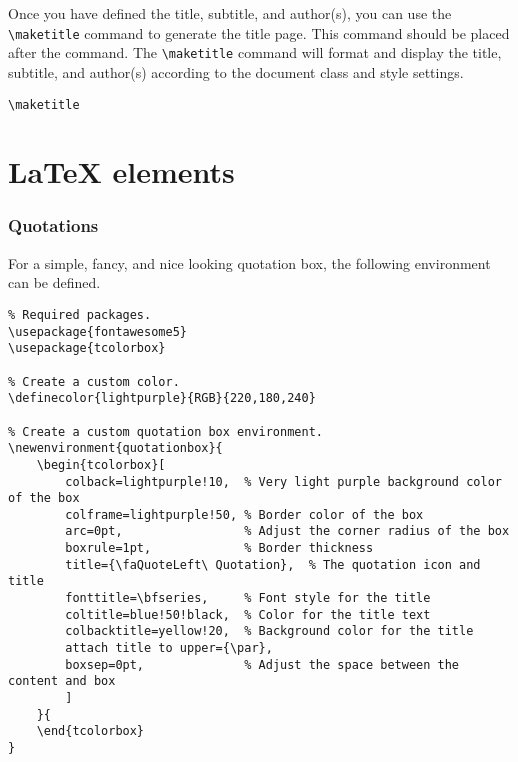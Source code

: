 Once you have defined the title, subtitle, and author(s), you can use the \lstinline|\maketitle| command to generate the title page. This command should be placed after the \lstinline|| command. The \lstinline|\maketitle| command will format and display the title, subtitle, and author(s) according to the document class and style settings.
\begin{lstlisting}
\maketitle
\end{lstlisting}















\section{LaTeX elements}






\subsubsection{Quotations}

For a simple, fancy, and nice looking quotation box, the following environment can be defined.
\begin{lstlisting}
% Required packages.
\usepackage{fontawesome5}
\usepackage{tcolorbox}

% Create a custom color.
\definecolor{lightpurple}{RGB}{220,180,240}

% Create a custom quotation box environment.
\newenvironment{quotationbox}{
	\begin{tcolorbox}[
		colback=lightpurple!10,  % Very light purple background color of the box
		colframe=lightpurple!50, % Border color of the box
		arc=0pt,                 % Adjust the corner radius of the box
		boxrule=1pt,             % Border thickness
		title={\faQuoteLeft\ Quotation},  % The quotation icon and title
		fonttitle=\bfseries,     % Font style for the title
		coltitle=blue!50!black,  % Color for the title text
		colbacktitle=yellow!20,  % Background color for the title
		attach title to upper={\par},
		boxsep=0pt,              % Adjust the space between the content and box
		]
	}{
	\end{tcolorbox}
}
\end{lstlisting}









